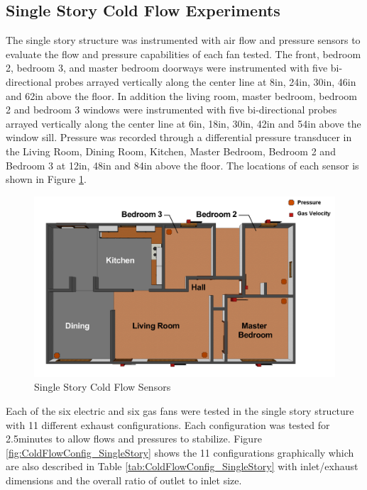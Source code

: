 \documentclass{article}
\begin{document}
\subsection{Single Story Cold Flow Experiments}
The single story structure was instrumented with air flow and pressure sensors to evaluate the flow and pressure capabilities of each fan tested. The front, bedroom 2, bedroom 3, and master bedroom doorways were instrumented with five bi-directional probes arrayed vertically along the center line at 8in, 24in, 30in, 46in and 62in above the floor. In addition the living room, master bedroom, bedroom 2 and bedroom 3 windows were instrumented with five bi-directional probes arrayed vertically along the center line at 6in, 18in, 30in, 42in and 54in above the window sill. Pressure was recorded through a differential pressure transducer in the Living Room, Dining Room, Kitchen, Master Bedroom, Bedroom 2 and Bedroom 3 at 12in, 48in and 84in above the floor. The locations of each sensor is shown in Figure \ref{fig:SingleStoryColdFlowSensors}. 

\begin{figure} [H]
	\centering
	\includegraphics[width = 5in]{0_Images/ColdFlow/SingleStory_Sensors.png}
	\caption{Single Story Cold Flow Sensors}
	\label{fig:SingleStoryColdFlowSensors}
\end{figure}

Each of the six electric and six gas fans were tested in the single story structure with 11 different exhaust configurations. Each configuration was tested for 2.5minutes to allow flows and pressures to stabilize. Figure \ref{fig:ColdFlowConfig_SingleStory} shows the 11 configurations graphically which are also described in Table \ref{tab:ColdFlowConfig_SingleStory} with inlet/exhaust dimensions and the overall ratio of outlet to inlet size. 
\end{document}
